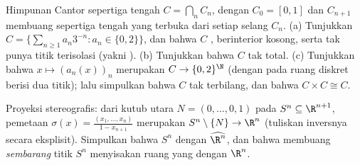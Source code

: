 \begin{exercise}[$\star\star\star$]\label{exo:b3:topology:10}
Himpunan Cantor sepertiga tengah $C = \bigcap_n C_n$, dengan $C_0 =
[0,1]$ dan $C_{n+1}$ membuang sepertiga tengah yang terbuka dari setiap
selang $C_n$.
(a) Tunjukkan $C = \bigl\{\sum_{n\geq1} a_n3^{-n} : a_n \in
\{0,2\}\bigr\}$, dan bahwa $C$ , berinterior kosong,
serta tak punya titik terisolasi (yakni \emph{}).
(b) Tunjukkan bahwa $C$ tak  total.
(c) Tunjukkan bahwa $x \mapsto (a_n(x))_n$ merupakan  $C \to
\{0,2\}^\N$ (dengan  pada ruang diskret berisi dua
titik); lalu simpulkan bahwa $C$ tak terbilang, dan bahwa $C \times C
\cong C$.
\end{exercise}

\begin{exercise}[$\star\star\star$]\label{exo:b3:topology:11}
Proyeksi stereografis: dari kutub utara $N = (0, \dots,
0, 1)$ pada $S^n \subseteq \R^{n+1}$, pemetaan $\sigma(x) =
\frac{(x_1, \dots, x_n)}{1 - x_{n+1}}$ merupakan  $S^n
\setminus \{N\} \to \R^n$ (tuliskan inversnya secara eksplisit). Simpulkan
bahwa $S^n$  dengan 
$\widehat{\R^n}$, dan bahwa membuang \emph{sembarang} titik $S^n$
menyisakan ruang yang  dengan $\R^n$.
\end{exercise}

